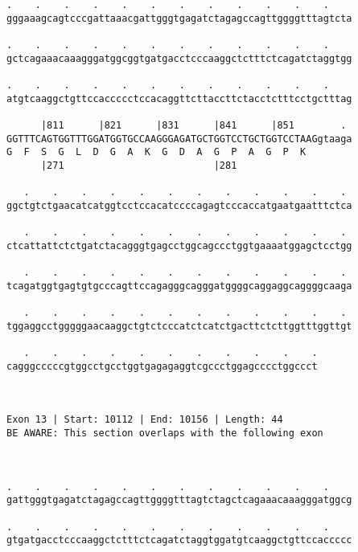 \documentclass{article}
\begin{document}
\begin{Verbatim}
.    .    .    .    .    .    .    .    .    .    .    .    
gggaaagcagtcccgattaaacgattgggtgagatctagagccagttggggtttagtcta
                                                            
.    .    .    .    .    .    .    .    .    .    .    .    
gctcagaaacaaagggatggcggtgatgacctcccaaggctctttctcagatctaggtgg
                                                            
.    .    .    .    .    .    .    .    .    .    .    .    
atgtcaaggctgttccaccccctccacaggttcttaccttctacctctttcctgctttag
                                                            
      |811      |821      |831      |841      |851        . 
GGTTTCAGTGGTTTGGATGGTGCCAAGGGAGATGCTGGTCCTGCTGGTCCTAAGgtaaga
G  F  S  G  L  D  G  A  K  G  D  A  G  P  A  G  P  K        
      |271                          |281                    
  
   .    .    .    .    .    .    .    .    .    .    .    . 
ggctgtctgaacatcatggtcctccacatccccagagtcccaccatgaatgaatttctca
                                                            
   .    .    .    .    .    .    .    .    .    .    .    . 
ctcattattctctgatctacagggtgagcctggcagccctggtgaaaatggagctcctgg
                                                            
   .    .    .    .    .    .    .    .    .    .    .    . 
tcagatggtgagtgtgcccagttccagagggcagggatggggcaggaggcaggggcaaga
                                                            
   .    .    .    .    .    .    .    .    .    .    .    . 
tggaggcctgggggaacaaggctgtctcccatctcatctgacttctcttggtttggttgt
                                                            
   .    .    .    .    .    .    .    .    .    .    .
cagggcccccgtggcctgcctggtgagagaggtcgccctggagcccctggccct
                                                      
                                                      
 
Exon 13 | Start: 10112 | End: 10156 | Length: 44
BE AWARE: This section overlaps with the following exon



.    .    .    .    .    .    .    .    .    .    .    .    
gattgggtgagatctagagccagttggggtttagtctagctcagaaacaaagggatggcg
                                                            
.    .    .    .    .    .    .    .    .    .    .    .    
gtgatgacctcccaaggctctttctcagatctaggtggatgtcaaggctgttccaccccc
                                                            

\end{Verbatim}
\end{document}
